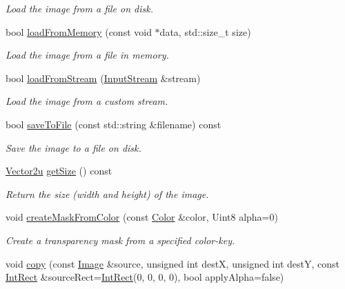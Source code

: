 \begin{DoxyCompactItemize}
\begin{DoxyCompactList}\small\item\em Load the image from a file on disk. \end{DoxyCompactList}\item 
bool \hyperlink{classsf_1_1_image_aaa6c7afa5851a51cec6ab438faa7354c}{load\+From\+Memory} (const void $\ast$data, std\+::size\+\_\+t size)
\begin{DoxyCompactList}\small\item\em Load the image from a file in memory. \end{DoxyCompactList}\item 
bool \hyperlink{classsf_1_1_image_a21122ded0e8368bb06ed3b9acfbfb501}{load\+From\+Stream} (\hyperlink{classsf_1_1_input_stream}{Input\+Stream} \&stream)
\begin{DoxyCompactList}\small\item\em Load the image from a custom stream. \end{DoxyCompactList}\item 
bool \hyperlink{classsf_1_1_image_a51537fb667f47cbe80395cfd7f9e72a4}{save\+To\+File} (const std\+::string \&filename) const
\begin{DoxyCompactList}\small\item\em Save the image to a file on disk. \end{DoxyCompactList}\item 
\hyperlink{classsf_1_1_vector2}{Vector2u} \hyperlink{classsf_1_1_image_a85409951b05369813069ed64393391ce}{get\+Size} () const
\begin{DoxyCompactList}\small\item\em Return the size (width and height) of the image. \end{DoxyCompactList}\item 
void \hyperlink{classsf_1_1_image_a22f13f8c242a6b38eb73cc176b37ae34}{create\+Mask\+From\+Color} (const \hyperlink{classsf_1_1_color}{Color} \&color, Uint8 alpha=0)
\begin{DoxyCompactList}\small\item\em Create a transparency mask from a specified color-\/key. \end{DoxyCompactList}\item 
void \hyperlink{classsf_1_1_image_ab2fa337c956f85f93377dcb52153a45a}{copy} (const \hyperlink{classsf_1_1_image}{Image} \&source, unsigned int destX, unsigned int destY, const \hyperlink{classsf_1_1_rect}{Int\+Rect} \&source\+Rect=\hyperlink{classsf_1_1_rect}{Int\+Rect}(0, 0, 0, 0), bool apply\+Alpha=false)

\end{DoxyCompactItemize}
